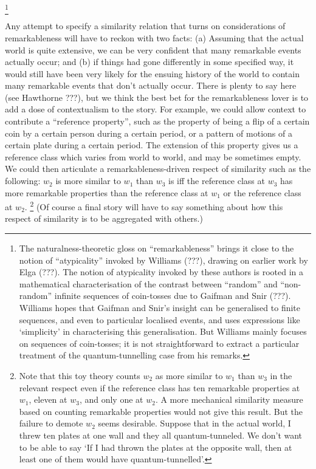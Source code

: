 \documentclass[If.tex]{subfiles}
\begin{document}
\footnote{The naturalness-theoretic gloss on “remarkableness” brings it close to the notion of “atypicality” invoked by Williams (???), drawing on earlier work by Elga (???). The notion of atypicality invoked by these authors is rooted in a mathematical characterisation of the contrast between “random” and “non-random” infinite sequences of coin-tosses due to Gaifman and Snir (???). Williams hopes that Gaifman and Snir's insight can be generalised to finite sequences, and even to particular localised events, and uses expressions like ‘simplicity’ in characterising this generalisation. But Williams mainly focuses on sequences of coin-tosses; it is not straightforward to extract a particular treatment of the quantum-tunnelling case from his remarks.}

Any attempt to specify a similarity relation that turns on considerations of remarkableness will have to reckon with two facts: (a) Assuming that the actual world is quite extensive, we can be very confident that many remarkable events actually occur; and (b) if things had gone differently in some specified way, it would still have been very likely for the ensuing history of the world to contain many remarkable events that don't actually occur. There is plenty to say here (see Hawthorne ???), but we think the best bet for the remarkableness lover is to add a dose of contextualism to the story. For example, we could allow context to contribute a “reference property”, such as the property of being a flip of a certain coin by a certain person during a certain period, or a pattern of motions of a certain plate during a certain period. The extension of this property gives us a reference class which varies from world to world, and may be sometimes empty. We could then articulate a remarkableness-driven respect of similarity such as the following: $w_2$ is more similar to $w_1$ than $w_3$ is iff the reference class at $w_3$ has more remarkable properties than the reference class at $w_1$ or the reference class at $w_2$.%
\footnote{Note that this toy theory counts $w_2$ as more similar to $w_1$ than $w_3$ in the relevant respect even if the reference class has ten remarkable properties at $w_1$, eleven at $w_3$, and only one at $w_2$. A more mechanical similarity measure based on counting remarkable properties would not give this result. But the failure to demote $w_2$ seems desirable. Suppose that in the actual world, I threw ten plates at one wall and they all quantum-tunneled. We don't want to be able to say ‘If I had thrown the plates at the opposite wall, then at least one of them would have quantum-tunnelled’.} 
(Of course a final story will have to say something about how this respect of similarity is to be aggregated with others.)
\end{document}
